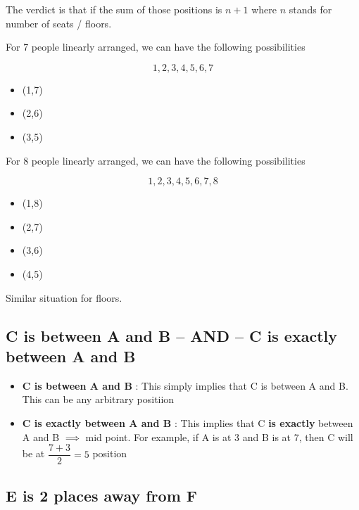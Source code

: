 The verdict is that if the sum of those positions is $n+1$ where $n$ stands for number of seats / floors. 

\begin{multicols}{2}
    For 7 people linearly arranged, we can have the following possibilities

    $$
    1,2,3,4,5,6,7
    $$
    
    \begin{itemize}
        \item (1,7)
        \item (2,6)
        \item (3,5)
    \end{itemize}
    
    \columnbreak

    For 8 people linearly arranged, we can have the following possibilities

    $$
    1,2,3,4,5,6,7,8
    $$
    
    \begin{itemize}
        \item (1,8)
        \item (2,7)
        \item (3,6)
        \item (4,5)
    \end{itemize}
    
\end{multicols}


Similar situation for floors. 

\subsection{C is between A and B -- AND -- C is exactly between A and B }

\begin{itemize}
    \item \textbf{C is between A and B} : This simply implies that C is between A and B. This can be any arbitrary positiion 
    
    \item \textbf{C is exactly between A and B} : This implies that C \textbf{is exactly} between A and B $\implies$ mid point. For example, if A is at 3 and B is at 7, then C will be at $\dfrac{7 + 3}{2} = 5$ position
\end{itemize}


\subsection{E is 2 places away from F}

